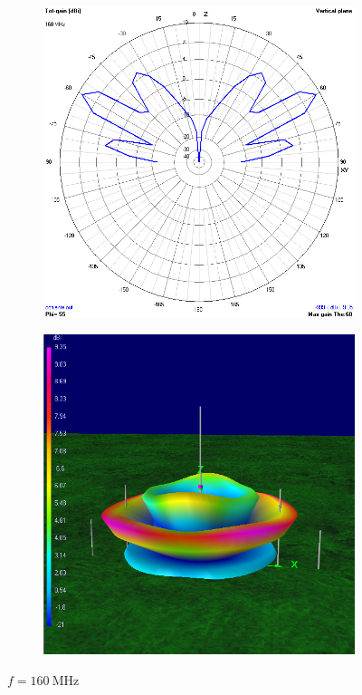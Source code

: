 \begin{figure}[H]
	\begin{subfigure}{0.5\textwidth}
		\includegraphics[scale=0.43]{imagenes/2D_160MHz_tierra.png}
	\end{subfigure}	
	\quad
	\begin{subfigure}{0.5\textwidth}
		\includegraphics[scale=0.43]{imagenes/3D_160MHz_tierra.png}
	\end{subfigure}
	\caption{$f=\SI{160}{\mega\hertz}$}
	\label{fig.radiacion_160M_tierra}
\end{figure}

